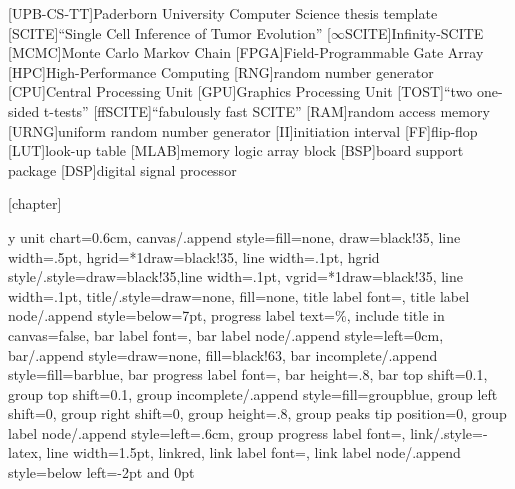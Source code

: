\theoremstyle{definition}
\newtheorem{definition}{Definition}[chapter]
\newtheorem{example}[definition]{Example}

\theoremstyle{plain}
\newtheorem{remark}[definition]{Remark}
\newtheorem{lemma}[definition]{Lemma}
\newtheorem{theorem}[definition]{Theorem}
\newtheorem{corollary}[definition]{Corollary}


\newcommand*{\eg}{e.\,g.}
\newcommand*{\ie}{i.\,e.}
\newcommand*{\cf}{c.\,f.}
\newcommand*{\etal}{et~al.}

[UPB-CS-TT]{Paderborn University Computer Science thesis template}
[SCITE]{``Single Cell Inference of Tumor Evolution''}
[$\infty$SCITE]{Infinity-SCITE}
[MCMC]{Monte Carlo Markov Chain}
[FPGA]{Field-Programmable Gate Array}
[HPC]{High-Performance Computing}
[RNG]{random number generator}
[CPU]{Central Processing Unit}
[GPU]{Graphics Processing Unit}
[TOST]{``two one-sided t-tests''}
[ffSCITE]{``fabulously fast SCITE''}
[RAM]{random access memory}
[URNG]{uniform random number generator}
[II]{initiation interval}
[FF]{flip-flop}
[LUT]{look-up table}
[MLAB]{memory logic array block}
[BSP]{board support package}
[DSP]{digital signal processor}

\DeclareMathOperator*{\argmax}{arg\,max}
\DeclareMathOperator*{\argmin}{arg\,min}


[chapter]

\ganttset
{%
	y unit chart=0.6cm,
	canvas/.append style={fill=none, draw=black!35, line width=.5pt},
	hgrid={*1{draw=black!35, line width=.1pt}},
	hgrid style/.style={draw=black!35,line width=.1pt},
	vgrid={*1{draw=black!35, line width=.1pt}},
	title/.style={draw=none, fill=none},
	title label font=\footnotesize,
	title label node/.append style={below=7pt},
	progress label text={\%},
	include title in canvas=false,
	bar label font=\small,
	bar label node/.append style={left=0cm},
	bar/.append style={draw=none, fill=black!63},
	bar incomplete/.append style={fill=barblue},
	bar progress label font=\footnotesize\color{black!70},
	bar height=.8,
	bar top shift=0.1,
	group top shift=0.1,
	group incomplete/.append style={fill=groupblue},
	group left shift=0,
	group right shift=0,
	group height=.8,
	group peaks tip position=0,
	group label node/.append style={left=.6cm},
	group progress label font=\small,
	link/.style={-latex, line width=1.5pt, linkred},
	link label font=\scriptsize,
	link label node/.append style={below left=-2pt and 0pt}
}
